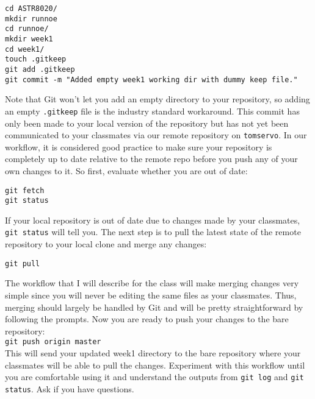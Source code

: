 \documentclass[12pt, letterpaper]{article}
\newcommand{\code}{\texttt}
\begin{document}
\begin{flushleft}
\code{cd ASTR8020/ \\
mkdir runnoe \\
cd runnoe/ \\
mkdir week1 \\
cd week1/ \\
touch .gitkeep \\
git add .gitkeep \\
git commit -m "Added empty week1 working dir with dummy keep file." \\
}
\end{flushleft}

Note that Git won't let you add an empty directory to your repository, so adding an empty \code{.gitkeep} file is the industry standard workaround.  This commit has only been made to your local version of the repository but has not yet been communicated to your classmates via our remote repository on \code{tomservo}.  In our workflow, it is considered good practice to make sure your repository is completely up to date relative to the remote repo before you push any of your own changes to it.  So first, evaluate whether you are out of date:

\begin{flushleft}
\code{git fetch \\
git status}
\end{flushleft}

If your local repository is out of date due to changes made by your classmates, \code{git status} will tell you.  The next step is to pull the latest state of the remote repository to your local clone and merge any changes:

\begin{flushleft}
\code{git pull}
\end{flushleft}

The workflow that I will describe for the class will make merging changes very simple since you will never be editing the same files as your classmates.  Thus, merging should largely be handled by Git and will be pretty straightforward by following the prompts.  Now you are ready to push your changes to the bare repository: \\

\noindent \code{git push origin master} \\

This will send your updated week1 directory to the bare repository where your classmates will be able to pull the changes.  Experiment with this workflow until you are comfortable using it and understand the outputs from \code{git log} and \code{git status}.  Ask if you have questions.
\end{document}
